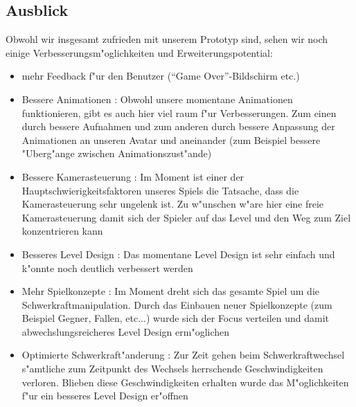 %
\subsection{Ausblick}
\label{sec:results/future}
%
Obwohl wir insgesamt zufrieden mit unserem Prototyp sind, sehen wir noch einige
Verbesserungsm"oglichkeiten und Erweiterungspotential:

\begin{itemize}
	\item
		mehr Feedback f"ur den Benutzer (``Game Over''-Bildschirm etc.)
	\item Bessere Animationen : Obwohl unsere momentane Animationen funktionieren, gibt es auch hier viel raum f"ur Verbesserungen. Zum einen durch bessere Aufnahmen und zum anderen durch bessere Anpassung der Animationen an unseren Avatar und aneinander (zum Beispiel bessere "Uberg"ange zwischen Animationszust"ande)
	\item Bessere Kamerasteuerung : Im Moment ist einer der Hauptschwierigkeitsfaktoren unseres Spiels die Tatsache, dass die Kamerasteuerung sehr ungelenk ist. Zu w"unschen w"are hier eine freie Kamerasteuerung damit sich der Spieler auf das Level und den Weg zum Ziel konzentrieren kann
	\item Besseres Level Design : Das momentane Level Design ist sehr einfach und k"onnte noch deutlich verbessert werden
	\item Mehr Spielkonzepte : Im Moment dreht sich das gesamte Spiel um die Schwerkraftmanipulation. Durch das Einbauen neuer Spielkonzepte (zum Beispiel Gegner, Fallen, etc...) wurde sich der Focus verteilen und damit abwechslungsreicheres Level Design erm"oglichen
	\item Optimierte Schwerkraft"anderung : Zur Zeit gehen beim Schwerkraftwechsel s"amtliche zum Zeitpunkt des Wechsels herrschende Geschwindigkeiten verloren. Blieben diese Geschwindigkeiten erhalten wurde das M"oglichkeiten f"ur ein besseres Level Design er"offnen 
\end{itemize}
